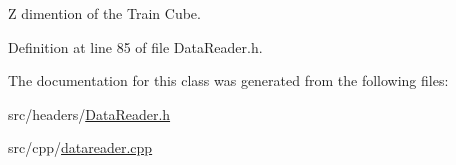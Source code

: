 Z dimention of the Train Cube. 



Definition at line 85 of file Data\+Reader.\+h.



The documentation for this class was generated from the following files\+:\begin{DoxyCompactItemize}
\item 
src/headers/\hyperlink{DataReader_8h}{Data\+Reader.\+h}\item 
src/cpp/\hyperlink{datareader_8cpp}{datareader.\+cpp}\end{DoxyCompactItemize}
